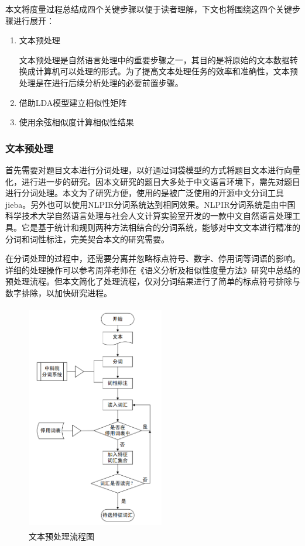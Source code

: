 本文将度量过程总结成四个关键步骤以便于读者理解，下文也将围绕这四个关键步骤进行展开：

\begin{enumerate}
    \item 文本预处理
    
    文本预处理是自然语言处理中的重要步骤之一，其目的是将原始的文本数据转换成计算机可以处理的形式。为了提高文本处理任务的效率和准确性，文本预处理是在进行后续分析处理的必要前置步骤。

    \item 借助LDA模型建立相似性矩阵
    \item 使用余弦相似度计算相似性结果
\end{enumerate}

\subsubsection{文本预处理}

首先需要对题目文本进行分词处理，以好通过词袋模型的方式将题目文本进行向量化，进行进一步的研究。因本文研究的题目大多处于中文语言环境下，需先对题目进行分词处理。本文为了研究方便，使用的是被广泛使用的开源中文分词工具jieba。另外也可以使用NLPIR分词系统达到相同效果。NLPIR分词系统是由中国科学技术大学自然语言处理与社会人文计算实验室开发的一款中文自然语言处理工具。它是基于统计和规则两种方法相结合的分词系统，能够对中文文本进行精准的分词和词性标注，完美契合本文的研究需要。

在分词处理的过程中，还需要分离并忽略标点符号、数字、停用词等词语的影响。详细的处理操作可以参考周萍老师在《语义分析及相似性度量方法》\cite{ZhouJiYuYuYiFenXiDeWenBenXiangSiXingDuLiangYanJiuJiYingYong2017}研究中总结的预处理流程。但本文简化了处理流程，仅对分词结果进行了简单的标点符号排除与数字排除，以加快研究进程。

\begin{figure}[htbp]
    \centering
    \includegraphics[width=6cm,height=10cm]{res/Text preprocessing process.png}
    \caption{文本预处理流程图}
\end{figure} 

